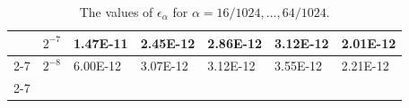 \begin{table}[]
\begin{tabular}{lllllll}
\multicolumn{1}{l|}{}           & \multicolumn{1}{l|}{$2^{-7}$} & \multicolumn{1}{l|}{\cellcolor[HTML]{FFFFFF}1.47E-11} & \multicolumn{1}{l|}{\cellcolor[HTML]{FFFFFF}2.45E-12} & \multicolumn{1}{l|}{\cellcolor[HTML]{FFFFFF}2.86E-12} & \multicolumn{1}{l|}{\cellcolor[HTML]{FFFFFF}3.12E-12} & \multicolumn{1}{l|}{\cellcolor[HTML]{FFFFFF}2.01E-12} \\ \cline{2-7} 
\multicolumn{1}{l|}{}           & \multicolumn{1}{l|}{$2^{-8}$} & \multicolumn{1}{l|}{\cellcolor[HTML]{C0C0C0}6.00E-12} & \multicolumn{1}{l|}{\cellcolor[HTML]{C0C0C0}3.07E-12} & \multicolumn{1}{l|}{\cellcolor[HTML]{C0C0C0}3.12E-12} & \multicolumn{1}{l|}{\cellcolor[HTML]{C0C0C0}3.55E-12} & \multicolumn{1}{l|}{\cellcolor[HTML]{C0C0C0}2.21E-12} \\ \cline{2-7} 
\end{tabular}
\caption{The values of $\epsilon_{\alpha}$ for $\alpha=16/1024,...,64/1024$.}
\label{tbl:alpha:energy}
\end{table}

